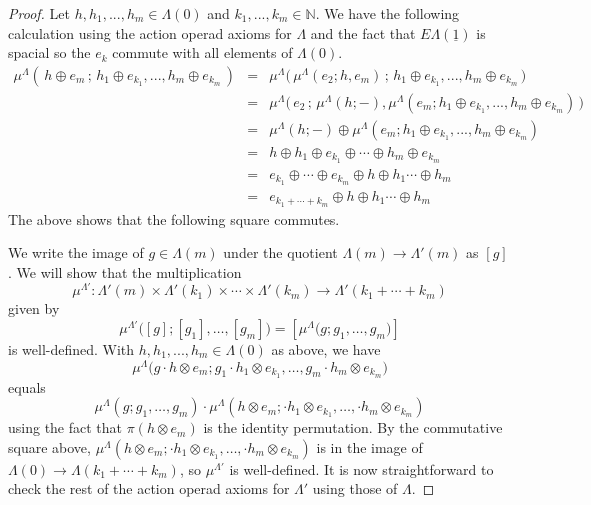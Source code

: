 \documentclass{amsbook} %
\newcommand{\EL}{E\Lambda}
\numberwithin{section}{chapter}
\begin{document}
\begin{proof}
Let $h, h_1, ..., h_m \in \Lambda(0)$ and $k_1, ..., k_m \in \mathbb{N}$. We have the following calculation using the action operad axioms for $\Lambda$ and the fact that $\EL(\underline{1})$ is spacial so the $e_k$ commute with all elements of $\Lambda(0)$.
\[ \begin{array}{rll}
		\mu^{\Lambda}( \, h \oplus e_m \, ; \, h_1 \oplus e_{k_1}, ..., h_m \oplus e_{k_m} \, ) & = & \mu^{\Lambda}\big( \, \mu^{\Lambda}(e_2; h, e_m) \, ; \, h_1 \oplus e_{k_1}, ..., h_m \oplus e_{k_m} \, \big) \\
		& = & \mu^{\Lambda}\big( \, e_2 \, ; \, \mu^{\Lambda}(h;-), \mu^{\Lambda}(e_m; h_1 \oplus e_{k_1}, ..., h_m \oplus e_{k_m}) \, \big) \\
		& = & \mu^{\Lambda}(h;-)\oplus \mu^{\Lambda}(e_m; h_1 \oplus e_{k_1}, ..., h_m \oplus e_{k_m})  \\
		& = & h \oplus h_1 \oplus e_{k_1} \oplus \cdots \oplus h_m \oplus e_{k_m} \\
		& = & e_{k_1} \oplus \cdots \oplus e_{k_m} \oplus h \oplus h_1 \cdots \oplus h_m \\
		& = & e_{k_1+\cdots+k_m} \oplus h \oplus h_1 \cdots \oplus h_m
		\end{array}
\]
The above shows that the following square commutes.
\begin{center}
\end{center}	

We write the image of $g \in \Lambda(m)$ under the quotient $\Lambda(m) \to \Lambda'(m)$ as $[g]$. We will show that the multiplication
\[
\mu^{\Lambda'}:\Lambda'(m) \times \Lambda'(k_1) \times \cdots \times \Lambda'(k_m) \to \Lambda'(k_1 + \cdots + k_m)
\]
given by 
\[
\mu^{\Lambda'}\Big( [g]; [g_1], \ldots , [g_m] \Big) = [\mu^{\Lambda}\Big(g; g_1, \ldots, g_m \Big)]
\]
is well-defined. With $h, h_1, ..., h_m \in \Lambda(0)$ as above, we have
\[
\mu^{\Lambda}\Big(g \cdot h \otimes e_m; g_1\cdot h_1 \otimes e_{k_1}, \ldots, g_m\cdot h_m \otimes e_{k_m} \Big) \]
equals
\[
\mu^{\Lambda}(g; g_1, \ldots, g_m) \cdot \mu^{\Lambda}(h \otimes e_m; \cdot h_1 \otimes e_{k_1}, \ldots, \cdot h_m \otimes e_{k_m})
\]
using the fact that $\pi(h \otimes e_m)$ is the identity permutation. By the commutative square above, $\mu^{\Lambda}(h \otimes e_m; \cdot h_1 \otimes e_{k_1}, \ldots, \cdot h_m \otimes e_{k_m})$ is in the image of $\Lambda(0) \to \Lambda(k_1 + \cdots + k_m)$, so $\mu^{\Lambda'}$ is well-defined. It is now straightforward to check the rest of the action operad axioms for $\Lambda'$ using those of $\Lambda$.
\end{proof}
\end{document}
